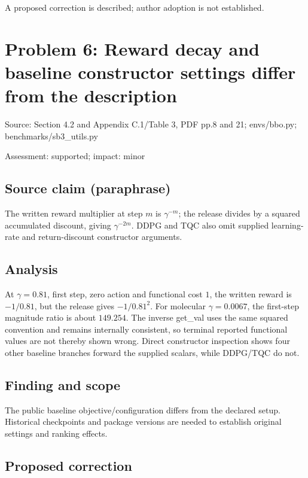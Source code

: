 \documentclass[11pt]{article}
\begin{document}
A proposed correction is described; author adoption is not established.

\section*{Problem 6: Reward decay and baseline constructor settings differ from the description}

Source: Section 4.2 and Appendix C.1/Table 3, PDF pp.8 and 21; envs/bbo.py; benchmarks/sb3\_utils.py

Assessment: supported; impact: minor

\subsection*{Source claim (paraphrase)}

The written reward multiplier at step \(m\) is \(\gamma^{-m}\); the release divides by a squared accumulated discount, giving \(\gamma^{-2m}\). DDPG and TQC also omit supplied learning-rate and return-discount constructor arguments.

\subsection*{Analysis}

At \(\gamma=0.81\), first step, zero action and functional cost \(1\), the written reward is \(-1/0.81\), but the release gives \(-1/0.81^2\). For molecular \(\gamma=0.0067\), the first-step magnitude ratio is about \(149.254\). The inverse get\_val uses the same squared convention and remains internally consistent, so terminal reported functional values are not thereby shown wrong. Direct constructor inspection shows four other baseline branches forward the supplied scalars, while DDPG/TQC do not.

\subsection*{Finding and scope}

The public baseline objective/configuration differs from the declared setup. Historical checkpoints and package versions are needed to establish original settings and ranking effects.

\subsection*{Proposed correction}
\end{document}
